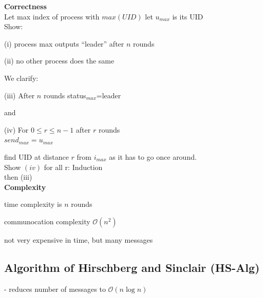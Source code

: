 \textbf{Correctness}\\
Let max index of process with $max(UID)$ let $u_{max}$ is its UID\\
Show:\\
\begin{compactitem}
\item[(i)] process max outputs ``leader'' after $n$ rounds
\item[(ii)] no other process does the same
\end{compactitem}

We clarify:\\
\begin{compactitem}
\item[(iii)] After $n$ rounds status$_{max}$=leader
\end{compactitem}
and\\
\begin{compactitem}
\item[(iv)] For $0\leq r\leq n-1$ after $r$ rounds\\
	$send_{max}=u_{max}$
\end{compactitem}
find UID at distance $r$ from $i_{max}$ as it has to go once around.\\

Show $(iv)$ for all r: Induction\\
then (iii)\\

\textbf{Complexity}\\
\begin{compactitem}
\item time complexity is $n$ rounds
\item communocation complexity $\mathcal{O}(n^2)$
\item not very expensive in time, but many messages

\end{compactitem}

\subsection{Algorithm of Hirschberg and Sinclair (HS-Alg)}
- reduces number of messages to $\mathcal{O}(n \log n)$\\

